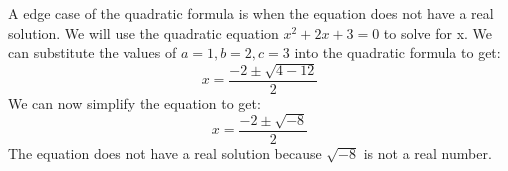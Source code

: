 \documentclass{article}
\begin{document}
A edge case of the quadratic formula is when the equation does not have a real solution. We will use the quadratic equation
$x^2 + 2x + 3 = 0$ to solve for x. We can substitute the values of $a = 1, b = 2, c = 3$ into the quadratic formula to get:
\[x = \frac{-2 \pm \sqrt{4 - 12}}{2}\]
We can now simplify the equation to get:
\[x = \frac{-2 \pm \sqrt{-8}}{2}\]
The equation does not have a real solution because $\sqrt{-8}$ is not a real number. 
\end{document}

